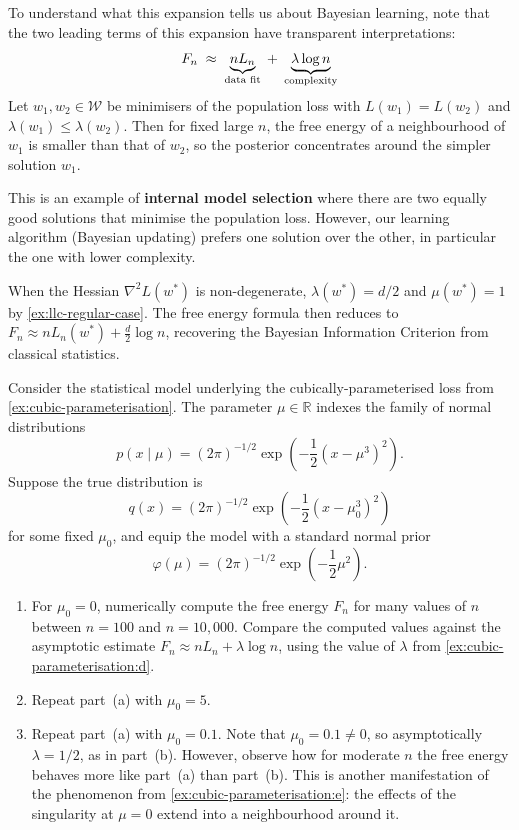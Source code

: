 \documentclass[11pt]{article}
\newcommand{\R}{\mathbb{R}}
\newcommand{\W}{\mathcal{W}}
\begin{document}
To understand what this expansion tells us about Bayesian learning, note that the two leading terms of this expansion have transparent interpretations:
$$F_n \;\approx\;
    \underbrace{n L_n\vphantom{\lambda}}_{\text{data fit}}
    \;+\;
    \underbrace{\lambda \log n}_{\text{complexity}}$$ Let $w_1, w_2 \in \W$ be minimisers of the population loss with $L(w_1) = L(w_2)$ and $\lambda(w_1) \leq \lambda(w_2)$. Then for fixed large $n$, the free energy of a neighbourhood of $w_1$ is smaller than that of $w_2$, so the posterior concentrates around the simpler solution $w_1$.

This is an example of \textbf{internal model selection} where there are two equally good solutions that minimise the population loss. However, our learning algorithm (Bayesian updating) prefers one solution over the other, in particular the one with lower complexity.

\begin{remark}
    When the Hessian $\nabla^2 L(w^*)$ is non-degenerate, $\lambda(w^*) = d/2$ and $\mu(w^*) = 1$ by \cref{ex:llc-regular-case}. The free energy
    formula then reduces to $F_n \approx n L_n(w^*) + \frac{d}{2} \log n$,
    recovering the Bayesian Information Criterion from classical statistics.
\end{remark}

\begin{exercise}
\label{ex:fef-numerical}
    Consider the statistical model underlying the cubically-parameterised loss from \cref{ex:cubic-parameterisation}. The parameter $\mu \in \R$ indexes the family of normal distributions
        $$p(x \mid \mu) = (2\pi)^{-1/2}\exp\!\left(-\frac{1}{2}(x - \mu^3)^2\right).$$
    Suppose the true distribution is
        $$q(x) = (2\pi)^{-1/2}\exp\!\left(-\frac{1}{2}(x - \mu_0^3)^2\right)$$
    for some fixed $\mu_0$, and equip the model with a standard normal prior
        $$\varphi(\mu) = (2\pi)^{-1/2}\exp\!\left(-\frac12\mu^2\right).$$
    \begin{enumerate}
        \item For $\mu_0 = 0$, numerically compute the free energy $F_n$ for many values of $n$ between $n = 100$ and $n = 10{,}000$. Compare the computed values against the asymptotic estimate $F_n \approx nL_n + \lambda \log n$, using the value of $\lambda$ from \cref{ex:cubic-parameterisation:d}.
        \item Repeat part~(a) with $\mu_0 = 5$.
        \item Repeat part~(a) with $\mu_0 = 0.1$. Note that $\mu_0 = 0.1 \neq 0$, so asymptotically $\lambda = 1/2$, as in part~(b). However, observe how for moderate $n$ the free energy behaves more like part~(a) than part~(b). This is another manifestation of the phenomenon from \cref{ex:cubic-parameterisation:e}: the effects of the singularity at $\mu = 0$ extend into a neighbourhood around it.
    \end{enumerate}
\end{exercise}
\end{document}
